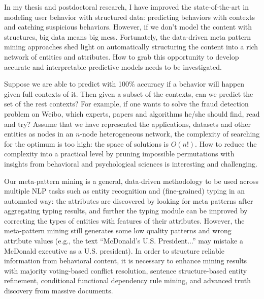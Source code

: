 \documentclass[10.5pt]{article}
\begin{document}
\vskip 0.02in
\vskip 0.01in

In my thesis and postdoctoral research, I have improved the state-of-the-art in modeling user behavior with structured data: predicting behaviors with contexts and catching suspicious behaviors. However, if we don't model the content with structures, big data means big mess. Fortunately, the data-driven meta pattern mining approaches shed light on automatically structuring the content into a rich network of entities and attributes. How to grab this opportunity to develop accurate and interpretable predictive models needs to be investigated.

Suppose we are able to predict with 100\% accuracy if a behavior will happen given full contexts of it. Then given a subset of the contexts, can we predict the set of the rest contexts? For example, if one wants to solve the fraud detection problem on Weibo, which experts, papers and algorithms he/she should find, read and try? Assume that we have represented the applications, datasets and other entities as nodes in an $n$-node heterogeneous network, the complexity of searching for the optimum is too high: the space of solutions is $O(n!)$. How to reduce the complexity into a practical level by pruning impossible permutations with insights from behavioral and psychological sciences is interesting and challenging.

\vskip 0.02in
\vskip 0.01in

Our meta-pattern mining is a general, data-driven methodology to be used across multiple NLP tasks such as entity recognition and (fine-grained) typing in an automated way: the attributes are discovered by looking for meta patterns after aggregating typing results, and further the typing module can be improved by correcting the types of entities with features of their attributes. However, the meta-pattern mining still generates some low quality patterns and wrong attribute values (e.g., the text ``McDonald's U.S. President...'' may mistake a McDonald executive as a U.S. president). In order to structure reliable information from behavioral content, it is necessary to enhance mining results with majority voting-based conflict resolution, sentence structure-based entity refinement, conditional functional dependency rule mining, and advanced truth discovery from massive documents.
\end{document}
